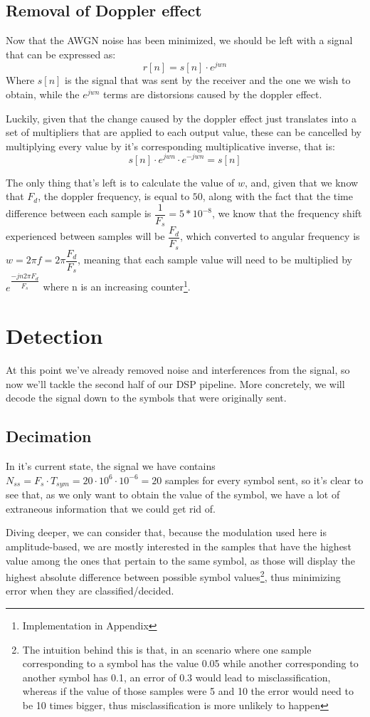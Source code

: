 \documentclass[conference,9pt]{IEEEtran}
\begin{document}
\subsection{Removal of Doppler effect}
Now that the AWGN noise has been minimized, we should be left with a signal that can be expressed as:
$$r[n]=s[n]\cdot e^{jwn}$$
Where $s[n]$ is the signal that was sent by the receiver and the one we wish to obtain, while the $e^{jwn}$ terms are distorsions caused by the doppler effect.

Luckily, given that the change caused by the doppler effect just translates into a set of multipliers that are applied to each output value, these can be cancelled by multiplying every value by it's corresponding multiplicative inverse, that is:
$$s[n]\cdot e^{jwn} \cdot e^{-jwn} = s[n]$$

The only thing that's left is to calculate the value of $w$, and, given that we know that $F_d$, the doppler frequency, is equal to $50$, along with the fact that the time difference between each sample is $\dfrac{1}{F_s}=5*10^{-8}$, we know that the frequency shift experienced between samples will be $\dfrac{F_d}{F_s}$, which converted to angular frequency is $w=2\pi f=2\pi \dfrac{F_d}{F_s}$, meaning that each sample value will need to be multiplied by $e^{\dfrac{-jn2\pi F_d}{F_s}}$ where n is an increasing counter\footnote{Implementation in Appendix}.



\section{Detection}
At this point we've already removed noise and interferences from the signal, so now we'll tackle the second half of our DSP pipeline. More concretely, we will decode the signal down to the symbols that were originally sent.

\subsection{Decimation}
In it's current state, the signal we have contains $N_{ss}=F_s \cdot T_{sym}=20\cdot10^6 \cdot 10^{-6} = 20$ samples for every symbol sent, so it's clear to see that, as we only want to obtain the value of the symbol, we have a lot of extraneous information that we could get rid of.

Diving deeper, we can consider that, because the modulation used here is amplitude-based, we are mostly interested in the samples that have the highest value among the ones that pertain to the same symbol, as those will display the highest absolute difference between possible symbol values\footnote{The intuition behind this is that, in an scenario where one sample corresponding to a symbol has the value 0.05 while another corresponding to another symbol has 0.1, an error of 0.3 would lead to misclassification, whereas if the value of those samples were 5 and 10 the error would need to be 10 times bigger, thus misclassification is more unlikely to happen}, thus minimizing error when they are classified/decided.
\end{document}
